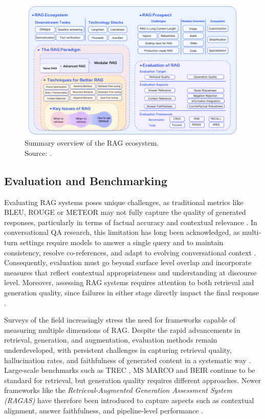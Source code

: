 \begin{spacing}{1.5}
\begin{figure}[H]
  \centering
  \includegraphics[width=\textwidth]{images/RAG_ecosystem.png} 
  \caption{Summary overview of the RAG ecosystem.\\
  \footnotesize{Source: \cite{gao_retrieval-augmented_2024}}.}
  \label{fig:summary_rag}
\end{figure}

\subsection{Evaluation and Benchmarking}\label{sec:eval_and_bench}
Evaluating RAG systems poses unique challenges, as traditional metrics like BLEU, ROUGE or METEOR may not fully capture the quality of generated responses, particularly in terms of factual accuracy and contextual relevance \citep{deriu_survey_2020}. In conversational QA research, this limitation has long been acknowledged, as multi-turn settings require models to answer a single query and to maintain consistency, resolve co-references, and adapt to evolving conversational context \citep{zaib_conversational_2022}. Consequently, evaluation must go beyond surface level overlap and incorporate measures that reflect contextual appropriateness and understanding at discourse level. Moreover, assessing RAG systems requires attention to both retrieval and generation quality, since failures in either stage directly impact the final response \citep{abeysinghe_challenges_2024}.

Surveys of the field increasingly stress the need for frameworks capable of measuring multiple dimensions of RAG. Despite the rapid advancements in retrieval, generation, and augmentation, evaluation methods remain underdeveloped, with persistent challenges in capturing retrieval quality, hallucination rates, and faithfulness of generated content in a systematic way \citep{gao_retrieval-augmented_2024}. Large-scale benchmarks such as TREC \citep{voorhees_trec_2005}, MS MARCO \citep{bajaj_ms_2018} and BEIR \citep{thakur_beir_2021} continue to be standard for retrieval, but generation quality requires different approaches. Newer frameworks like the \textit{Retrieval-Augmented Generation Assessment System (RAGAS)} have therefore been introduced to capture aspects such as contextual alignment, answer faithfulness, and pipeline-level performance \citep{es_ragas_2023}.


\end{spacing}
